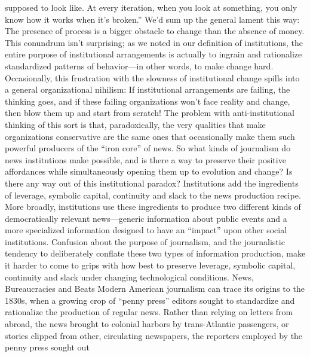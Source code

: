 supposed to look like. At every iteration, when you look at something, you only
know how it works when it’s broken.''
We’d sum up the general lament this way: The presence of process is a bigger
obstacle to change than the absence of money. This conundrum isn’t surprising;
as we noted in our definition of institutions, the entire purpose of institutional
arrangements is actually to ingrain and rationalize standardized patterns of
behavior—in other words, to make change hard.
Occasionally, this frustration with the slowness of institutional change spills into
a general organizational nihilism: If institutional arrangements are failing, the
thinking goes, and if these failing organizations won’t face reality and change,
then blow them up and start from scratch! The problem with anti-institutional
thinking of this sort is that, paradoxically, the very qualities that make organizations
conservative are the same ones that occasionally make them such powerful
producers of the ``iron core'' of news.
So what kinds of journalism do news institutions make possible, and is there a way
to preserve their positive affordances while simultaneously opening them up to
evolution and change? Is there any way out of this institutional paradox? Institutions
add the ingredients of leverage, symbolic capital, continuity and slack to the
news production recipe. More broadly, institutions use these ingredients to produce
two different kinds of democratically relevant news—generic information about
public events and a more specialized information designed to have an ``impact''
upon other social institutions. Confusion about the purpose of journalism, and
the journalistic tendency to deliberately conflate these two types of information
production, make it harder to come to grips with how best to preserve leverage,
symbolic capital, continuity and slack under changing technological conditions.
News, Bureaucracies and Beats
Modern American journalism can trace its origins to the 1830s, when a growing
crop of ``penny press'' editors sought to standardize and rationalize the production
of regular news. Rather than relying on letters from abroad, the news brought
to colonial harbors by trans-Atlantic passengers, or stories clipped from other,
circulating newspapers, the reporters employed by the penny press sought out

